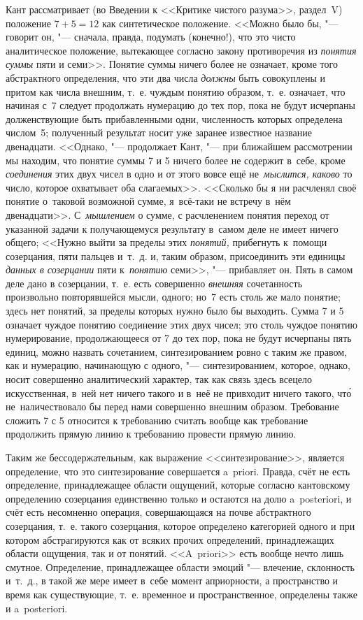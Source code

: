 Кант рассматривает (во Введении к <<Критике чистого разума>>, раздел~V)
положение $7+5=12$ как синтетическое положение. <<Можно было бы, "---
говорит он, "--- сначала, правда, подумать (конечно!), что это чисто
аналитическое положение, вытекающее согласно закону противоречия из
{\em понятия суммы} пяти и семи>>. Понятие суммы ничего более не означает,
кроме того абстрактного определения, что эти два числа {\em должны} быть
совокуплены и притом как числа внешним, т.~е. чуждым понятию образом, т.~е.
означает, что начиная с~7 следует продолжать нумерацию до тех пор, пока не
будут исчерпаны долженствующие быть прибавленными одни, численность которых
определена числом~5; полученный результат носит уже заранее известное название
двенадцати. <<Однако, "--- продолжает Кант, "--- при ближайшем рассмотрении мы
находим, что понятие суммы 7 и 5 ничего более не содержит в~себе, кроме
{\em соединения} этих двух чисел в одно и от этого вовсе ещё
не~{\em мыслится, каково} то число, которое охватывает оба слагаемых>>.
<<Сколько бы я ни расчленял своё понятие о~таковой возможной сумме,
я~всё-таки не встречу в~нём двенадцати>>. С~{\em мышлением} о сумме,
с расчленением понятия переход от указанной задачи к получающемуся результату
в~самом деле не имеет ничего общего; <<Нужно выйти за пределы этих
{\em понятий,} прибегнуть к~помощи
созерцания, пяти пальцев и~т.~д. и, таким образом, присоединить эти
единицы {\em данных в созерцании} пяти к~{\em понятию} семи>>, "--- прибавляет
он. Пять в самом деле дано в созерцании, т.~е. есть совершенно {\em внешняя}
сочетанность произвольно повторявшейся мысли, одного; но~7 есть столь же мало
понятие; здесь нет понятий, за пределы которых нужно было бы выходить. Сумма
7 и 5 означает чуждое понятию соединение этих двух чисел; это столь чуждое
понятию нумерирование, продолжающееся от 7 до тех пор, пока не будут исчерпаны
пять единиц, можно назвать сочетанием, синтезированием ровно с таким же правом,
как и нумерацию, начинающую с одного, "--- синтезированием, которое, однако,
носит совершенно аналитический характер, так как связь здесь всецело
искусственная, в~ней нет ничего такого и в~неё не привходит ничего такого,
чт\'{о} не~наличествовало бы перед нами совершенно внешним образом. Требование
сложить 7 с 5 относится к требованию считать вообще как требование продолжить
прямую линию к требованию провести прямую линию.

Таким же бессодержательным, как выражение <<синтезирование>>, является
определение, что это синтезирование совершается a~priori. Правда, счёт не
есть определение, принадлежащее области ощущений, которые согласно кантовскому
определению созерцания единственно только и остаются на долю a~poste\-riori, и
счёт есть несомненно операция, совершающаяся на почве абстрактного
созерцания, т.~е. такого созерцания, которое определено категорией одного и при
котором абстрагируются как от всяких прочих определений, принадлежащих области
ощущения, так и от понятий. <<A~priori>> есть вообще нечто лишь смутное.
Определение, принадлежащее области эмоций "--- влечение, склонность и~т.~д.,
в такой же мере имеет в~себе момент априорности, а пространство и время как
существующие, т.~е. временное и пространственное, определены также и
a~poste\-ri\-ori.

